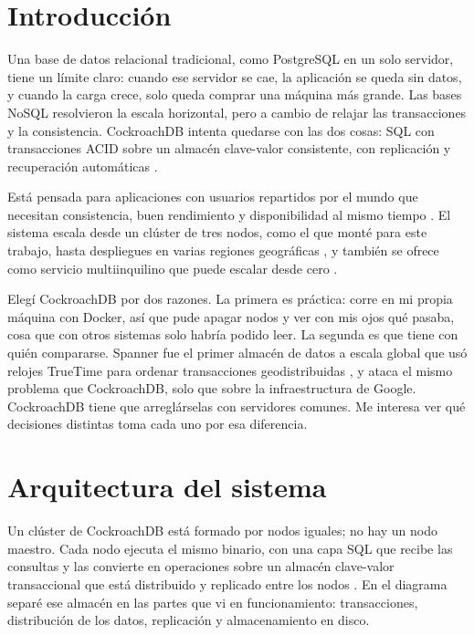 \documentclass[12pt,a4paper]{article}
\begin{document}
\newpage
\tableofcontents
\newpage

\section{Introducción}

Una base de datos relacional tradicional, como PostgreSQL en un solo servidor, tiene un límite claro: cuando ese servidor se cae, la aplicación se queda sin datos, y cuando la carga crece, solo queda comprar una máquina más grande. Las bases NoSQL resolvieron la escala horizontal, pero a cambio de relajar las transacciones y la consistencia. CockroachDB intenta quedarse con las dos cosas: SQL con transacciones ACID sobre un almacén clave-valor consistente, con replicación y recuperación automáticas \cite{pina2023newsql}.

Está pensada para aplicaciones con usuarios repartidos por el mundo que necesitan consistencia, buen rendimiento y disponibilidad al mismo tiempo \cite{vanbenschoten2022multiregion}. El sistema escala desde un clúster de tres nodos, como el que monté para este trabajo, hasta despliegues en varias regiones geográficas \cite{vanbenschoten2022multiregion, ajmani2022demo}, y también se ofrece como servicio multiinquilino que puede escalar desde cero \cite{swenson2025serverless}.

Elegí CockroachDB por dos razones. La primera es práctica: corre en mi propia máquina con Docker, así que pude apagar nodos y ver con mis ojos qué pasaba, cosa que con otros sistemas solo habría podido leer. La segunda es que tiene con quién compararse. Spanner fue el primer almacén de datos a escala global que usó relojes TrueTime para ordenar transacciones geodistribuidas \cite{song2025k2}, y ataca el mismo problema que CockroachDB, solo que sobre la infraestructura de Google. CockroachDB tiene que arreglárselas con servidores comunes. Me interesa ver qué decisiones distintas toma cada uno por esa diferencia.

\section{Arquitectura del sistema}

Un clúster de CockroachDB está formado por nodos iguales; no hay un nodo maestro. Cada nodo ejecuta el mismo binario, con una capa SQL que recibe las consultas y las convierte en operaciones sobre un almacén clave-valor transaccional que está distribuido y replicado entre los nodos \cite{pina2023newsql, swenson2025serverless}. En el diagrama separé ese almacén en las partes que vi en funcionamiento: transacciones, distribución de los datos, replicación y almacenamiento en disco.
\end{document}
